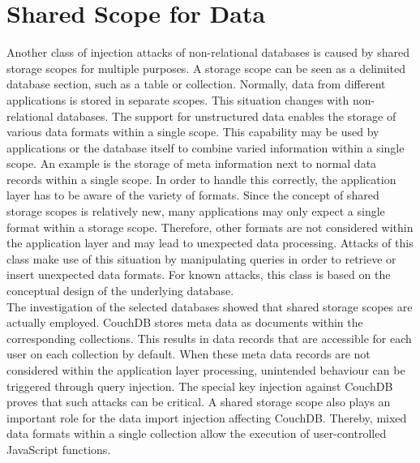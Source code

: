 \section{Shared Scope for Data}
Another class of injection attacks of non-relational databases is caused by shared storage scopes for multiple purposes. A storage scope can be seen as a delimited database section, such as a table or collection. Normally, data from different applications is stored in separate scopes. This situation changes with non-relational databases. The support for unstructured data enables the storage of various data formats within a single scope. This capability may be used by applications or the database itself to combine varied information within a single scope. An example is the storage of meta information next to normal data records within a single scope. In order to handle this correctly, the application layer has to be aware of the variety of formats. Since the concept of shared storage scopes is relatively new, many applications may only expect a single format within a storage scope. Therefore, other formats are not considered within the application layer and may lead to unexpected data processing. Attacks of this class make use of this situation by manipulating queries in order to retrieve or insert unexpected data formats. For known attacks, this class is based on the conceptual design of the underlying database. \\

The investigation of the selected databases showed that shared storage scopes are actually employed. CouchDB stores meta data as documents within the corresponding collections. This results in data records that are accessible for each user on each collection by default. When these meta data records are not considered within the application layer processing, unintended behaviour can be triggered through query injection. The special key injection against CouchDB proves that such attacks can be critical. A shared storage scope also plays an important role for the data import injection affecting CouchDB. Thereby, mixed data formats within a single collection allow the execution of user-controlled JavaScript functions.

